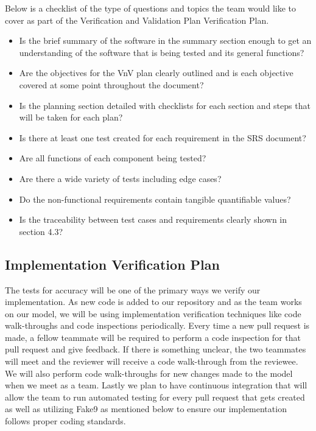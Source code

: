 \documentclass[12pt, titlepage]{article}
\begin{document}
  Below is a checklist of the type of questions and topics the team would like to cover as part of the Verification and Validation Plan Verification Plan.\\
  
  \begin{itemize}
  
  \item Is the brief summary of the software in the summary section enough to get an understanding of the software that is being tested and its general functions?
  \item Are the objectives for the VnV plan clearly outlined and is each objective covered at some point throughout the document?
  \item Is the planning section detailed with checklists for each section and steps that will be taken for each plan?
  \item Is there at least one test created for each requirement in the SRS document?
  \item Are all functions of each component being tested?
  \item Are there a wide variety of tests including edge cases?
  \item Do the non-functional requirements contain tangible quantifiable values?
  \item Is the traceability between test cases and requirements clearly shown in section 4.3?
  \end{itemize}
  
  
  \subsection{Implementation Verification Plan} \label{Implementation Verification Plan}
  
  The tests for accuracy will be one of the primary ways we verify our implementation. As new code is added to our repository and as the team works on our model, we will be using implementation verification techniques like code walk-throughs and code inspections periodically. Every time a new pull request is made, a fellow teammate will be required to perform a code inspection for that pull request and give feedback. If there is something unclear, the two teammates will meet and the reviewer will receive a code walk-through from the reviewee. We will also perform code walk-throughs for new changes made to the model when we meet as a team. Lastly we plan to have continuous integration that will allow the team to run automated testing for every pull request that gets created as well as utilizing Fake9 as mentioned below to ensure our implementation follows proper coding standards.
  
\end{document}
